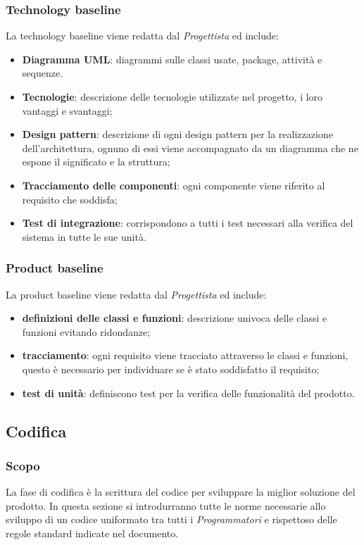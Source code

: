 \subsubsection{Technology baseline}\label{2.2.4.4}
La technology baseline viene redatta dal \textit{Progettista} ed include:
\begin{itemize}
	\item \textbf{Diagramma UML}: diagrammi sulle classi usate, package, attività e sequenze.
	\item \textbf{Tecnologie}: descrizione delle tecnologie utilizzate nel progetto, i loro vantaggi e svantaggi;
	\item \textbf{Design pattern}: descrizione di ogni design pattern per la realizzazione dell'architettura, ognuno di essi viene accompagnato da un diagramma che ne espone il significato e la struttura; 
	\item \textbf{Tracciamento delle componenti}: ogni componente viene riferito al requisito che soddisfa;
	\item \textbf{Test di integrazione}: corrispondono a tutti i test necessari alla verifica del sistema in tutte le sue unità.
\end{itemize}
\subsubsection{Product baseline}\label{2.2.4.5}
La product baseline viene redatta dal \textit{Progettista} ed include:
\begin{itemize}
	\item \textbf{definizioni delle classi e funzioni}: descrizione univoca delle classi e funzioni evitando ridondanze;
	\item \textbf{tracciamento}: ogni requisito viene tracciato attraverso le classi e funzioni, questo è necessario per individuare se è stato soddisfatto il requisito;
	\item \textbf{test di unità}: definiscono test per la verifica delle funzionalità del prodotto.
\end{itemize}
\subsection{Codifica}\label{2.2.5}

\subsubsection{Scopo}\label{2.2.5.1}
La fase di codifica è la scrittura del codice per sviluppare la miglior soluzione del prodotto. In questa sezione si introdurranno tutte le norme necessarie allo sviluppo di un codice uniformato tra tutti i \textit{Programmatori} e rispettoso delle regole standard indicate nel documento.
